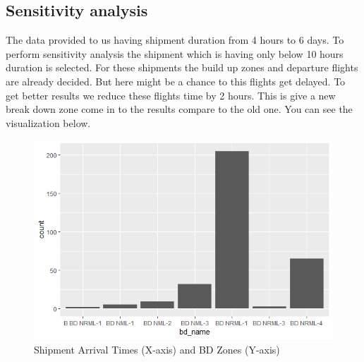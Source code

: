 \documentclass[11pt,a4paper,fleqn]{article}
\begin{document}
	\pagebreak
	\subsection{Sensitivity analysis}
	The data provided to us having shipment duration from 4 hours to 6 days. To perform sensitivity analysis the shipment which is having only below 10 hours duration is selected. For these shipments the build up zones and departure flights are already decided. But here might be a chance to this flights get delayed. To get better results we reduce these flights time by 2 hours. This is give a new break down zone come in to the results compare to the old one. You can see the visualization below.
	
	\begin{figure}[hbt!]
		\centering
		\includegraphics[width=150mm,scale=1.0]{rplot_sa.png}
		\caption{Shipment Arrival Times (X-axis) and BD Zones (Y-axis)}
		\label{fig:Shipment Arrival Times (X-axis) and BD Zones (Y-axis)}
	\end{figure}

	
	
	
\end{document}
